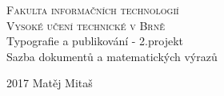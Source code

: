 \documentclass[11pt]{article}
\theoremstyle{definition}
\theoremstyle{plain}
\begin{document}
	\begin{center}
    	\Huge
		\textsc{Fakulta informačních technologií \\Vysoké učení technické v Brně} \\[84mm]
		\LARGE Typografie a publikování - 2.projekt\\
		Sazba dokumentů a matematických výrazů
		\\[122mm]
    	\vfill
	\end{center}
	{\LARGE 2017 \hfill Matěj Mitaš}
	

	
	
	
	\thispagestyle{empty}
	
\end{document}
